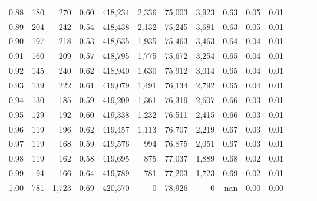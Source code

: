 \begin{tabular}{rrrrrrrrrrrrrr}
0.88 &     180 &    270 &  0.60 &  418,234 &    2,336 &  75,003 &   3,923 &  0.63 &  0.05 &      0.01 \\
0.89 &     204 &    242 &  0.54 &  418,438 &    2,132 &  75,245 &   3,681 &  0.63 &  0.05 &      0.01 \\
0.90 &     197 &    218 &  0.53 &  418,635 &    1,935 &  75,463 &   3,463 &  0.64 &  0.04 &      0.01 \\
0.91 &     160 &    209 &  0.57 &  418,795 &    1,775 &  75,672 &   3,254 &  0.65 &  0.04 &      0.01 \\
0.92 &     145 &    240 &  0.62 &  418,940 &    1,630 &  75,912 &   3,014 &  0.65 &  0.04 &      0.01 \\
0.93 &     139 &    222 &  0.61 &  419,079 &    1,491 &  76,134 &   2,792 &  0.65 &  0.04 &      0.01 \\
0.94 &     130 &    185 &  0.59 &  419,209 &    1,361 &  76,319 &   2,607 &  0.66 &  0.03 &      0.01 \\
0.95 &     129 &    192 &  0.60 &  419,338 &    1,232 &  76,511 &   2,415 &  0.66 &  0.03 &      0.01 \\
0.96 &     119 &    196 &  0.62 &  419,457 &    1,113 &  76,707 &   2,219 &  0.67 &  0.03 &      0.01 \\
0.97 &     119 &    168 &  0.59 &  419,576 &      994 &  76,875 &   2,051 &  0.67 &  0.03 &      0.01 \\
0.98 &     119 &    162 &  0.58 &  419,695 &      875 &  77,037 &   1,889 &  0.68 &  0.02 &      0.01 \\
0.99 &      94 &    166 &  0.64 &  419,789 &      781 &  77,203 &   1,723 &  0.69 &  0.02 &      0.01 \\
1.00 &     781 &  1,723 &  0.69 &  420,570 &        0 &  78,926 &       0 &   nan &  0.00 &      0.00 \\
\bottomrule
\end{tabular}
